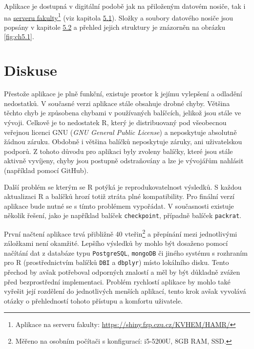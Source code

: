 \documentclass[12pt,]{article}
\let\rmarkdownfootnote\footnote%
\def\footnote{\protect\rmarkdownfootnote}
\begin{document}
\qquad Aplikace je dostupná v digitální podobě jak na přiloženým datovém
nosiče, tak i na \href{https://shiny.fzp.czu.cz/KVHEM/HAMR/}{serveru
fakulty}\footnote{Aplikace na serveru fakulty:
  \url{https://shiny.fzp.czu.cz/KVHEM/HAMR/}} (viz kapitola
\protect\hyperlink{techres}{5.1}). Složky a soubory datového nosiče jsou
popsány v kapitole \protect\hyperlink{data}{5.2} a přehled jejich
struktury je znázorněn na obrázku \ref{fig:ch5.1}.

\newpage

\hypertarget{diskuse}{\section{Diskuse}\label{diskuse}}

\qquad Přestože aplikace je plně funkční, existuje prostor k jejímu
vylepšení a odladění nedostatků. V současné verzi aplikace stále
obsahuje drobné chyby. Většina těchto chyb je způsobena chybami v
používaných balíčcích, jelikož jsou stále ve vývoji. Celkově je to
nedostatek R, který je distribuovaný pod všeobecnou veřejnou licenci GNU
(\emph{GNU General Public License}) a neposkytuje absolutně žádnou
záruku. Obdobně i většina balíčků neposkytuje záruky, ani uživatelskou
podporů. Z tohoto důvodu pro aplikaci byly zvoleny balíčky, které jsou
stále aktivně vyvíjeny, chyby jsou postupně odstraňovány a lze je
vývojářům nahlásit (například pomocí GitHub).

\qquad Další problém se kterým se R potýká je reprodukovatelnost
výsledků. S každou aktualizaci R a balíčků hrozí totiž ztráta plné
kompatibility. Pro finální verzí aplikace bude nutné se s tímto
problémem vypořádat. V současnosti existuje několik řešení, jako je
například balíček \texttt{checkpoint}, případně balíček
\texttt{packrat}.

\qquad První načtení aplikace trvá přibližně 40 vteřin\footnote{Měřeno
  na osobním počítači s konfigurací: i5-5200U, 8GB RAM, SSD.} a
přepínání mezi jednotlivými záložkami není okamžité. Lepšího výsledků by
mohlo být dosaženo pomocí načítání dat z databáze typu
\texttt{PostgreSQL}, \texttt{mongoDB} či jiného systému s rozhraním pro
R (prostřednictvím balíčků \texttt{DBI} a \texttt{dbplyr}) místo
lokálního disku. Tento přechod by avšak potřeboval odporných znalostí a
měl by být důkladně zvážen před bezprostřední implementaci. Problém
rychlostí aplikace by mohlo také vyřešit její rozdělení do jednotlivých
menších aplikací, tento krok avšak vyvolává otázky o přehledností tohoto
přístupu a komfortu uživatele.
\end{document}
